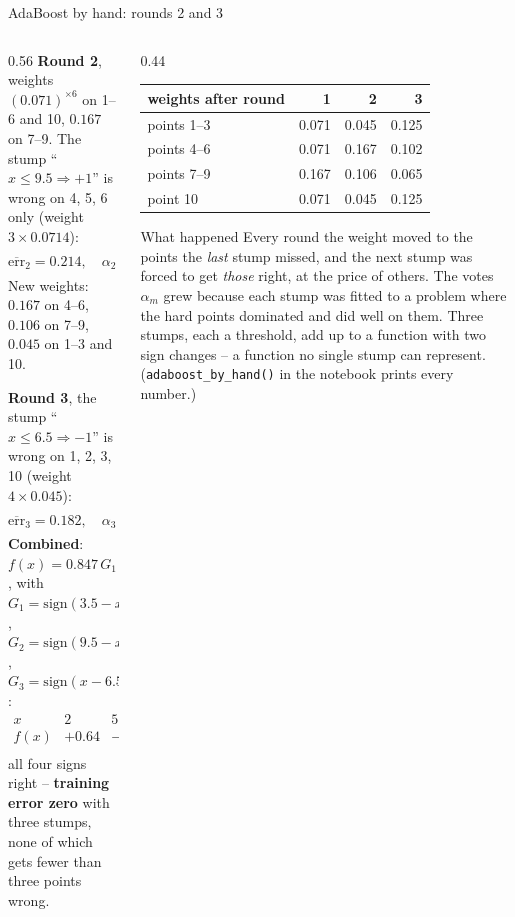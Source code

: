 \documentclass[10pt,aspectratio=169]{beamer}
\newcommand{\err}{\overline{\mathrm{err}}}
\newcommand{\sgn}{\mathrm{sign}}
\begin{document}
\begin{frame}{AdaBoost by hand: rounds 2 and 3}
\footnotesize
\begin{columns}[T]
\begin{column}{0.56\textwidth}
\textbf{Round 2}, weights $(0.071)^{\times6}$ on 1--6 and 10, $0.167$ on
7--9.  The stump ``$x\leq9.5\Rightarrow+1$'' is wrong on 4, 5, 6 only
(weight $3\times0.0714$):
\[
\err_2=0.214,\quad\alpha_2=\log\frac{0.786}{0.214}=1.299 .
\]
New weights: $0.167$ on 4--6, $0.106$ on 7--9, $0.045$ on 1--3 and 10.

\textbf{Round 3}, the stump ``$x\leq6.5\Rightarrow-1$'' is wrong on 1, 2,
3, 10 (weight $4\times0.045$):
\[
\err_3=0.182,\quad\alpha_3=\log\frac{0.818}{0.182}=1.504 .
\]
\textbf{Combined}: $f(x)=0.847\,G_1+1.299\,G_2+1.504\,G_3$, with
$G_1=\sgn(3.5-x)$, $G_2=\sgn(9.5-x)$, $G_3=\sgn(x-6.5)$:
\[
\begin{array}{c|cccc}
x & 2 & 5 & 8 & 10\\ \hline
f(x) & +0.64 & -1.05 & +1.96 & -0.64\\
\end{array}
\]
all four signs right -- \textbf{training error zero} with three stumps, none
of which gets fewer than three points wrong.
\end{column}
\begin{column}{0.44\textwidth}
\begin{tabular}{@{}lrrr@{}}
\toprule
weights after round & 1 & 2 & 3\\
\midrule
points 1--3 & 0.071 & 0.045 & 0.125\\
points 4--6 & 0.071 & 0.167 & 0.102\\
points 7--9 & 0.167 & 0.106 & 0.065\\
point 10    & 0.071 & 0.045 & 0.125\\
\bottomrule
\end{tabular}
\medskip

\begin{block}{What happened}
Every round the weight moved to the points the \emph{last} stump missed, and
the next stump was forced to get \emph{those} right, at the price of others.
The votes $\alpha_m$ grew because each stump was fitted to a problem where
the hard points dominated and did well on them.  Three stumps, each a
threshold, add up to a function with two sign changes -- a function no
single stump can represent.  (\texttt{adaboost\_by\_hand()} in the
notebook prints every number.)
\end{block}
\end{column}
\end{columns}
\end{frame}
\end{document}
